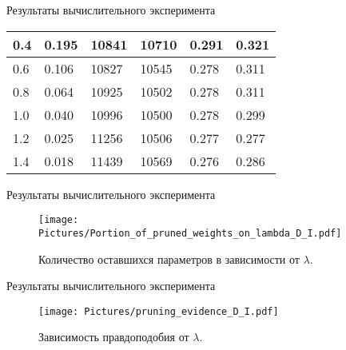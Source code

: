 \documentclass{beamer}
\begin{document}
\begin{frame}{Результаты вычислительного эксперимента}
\begin{table}[]
\begin{tabular}{|l|l|l|l|l|l|}
		0.4               & 0.195                                 & 10841                              & 10710                              & 0.291                           & 0.321                           \\ \hline
		0.6               & 0.106                                 & 10827                              & 10545                              & 0.278                           & 0.311                           \\ \hline
		0.8               & 0.064                                 & 10925                              & 10502                              & 0.278                           & 0.311                           \\ \hline
		1.0                 & 0.040                                 & 10996                              & 10500                              & 0.278                           & 0.299                           \\ \hline
		1.2               & 0.025                                 & 11256                              & 10506                              & 0.277                           & 0.277                           \\ \hline
		1.4               & 0.018                                 & 11439                              & 10569                              & 0.276                           & 0.286                           \\ \hline
	\end{tabular}
\end{table}



\end{frame}

\begin{frame}{Результаты вычислительного эксперимента}
	
	
\begin{figure}
	\texttt{[image: Pictures/Portion\_of\_pruned\_weights\_on\_lambda\_D\_I.pdf]}
	\caption{Количество оставшихся параметров в зависимости от $\lambda$.}
\end{figure}
	
\end{frame}

\begin{frame}{Результаты вычислительного эксперимента}


\begin{figure}
\texttt{[image: Pictures/pruning\_evidence\_D\_I.pdf]}
\caption{Зависимость правдоподобия от $\lambda$.}
\end{figure}
	
\end{frame}
\end{document}

